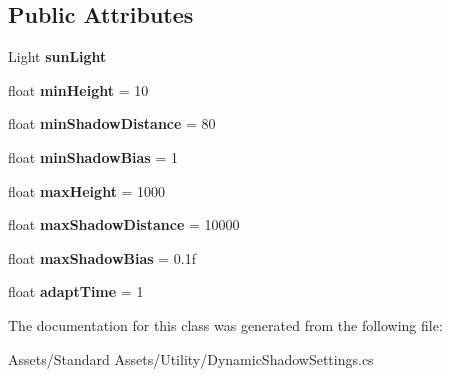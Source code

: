 \subsection*{Public Attributes}
\begin{DoxyCompactItemize}
\item 
Light {\bfseries sun\+Light}\hypertarget{class_unity_standard_assets_1_1_utility_1_1_dynamic_shadow_settings_a9113da6dce94c015bfefb8542e40b35a}{}\label{class_unity_standard_assets_1_1_utility_1_1_dynamic_shadow_settings_a9113da6dce94c015bfefb8542e40b35a}

\item 
float {\bfseries min\+Height} = 10\hypertarget{class_unity_standard_assets_1_1_utility_1_1_dynamic_shadow_settings_afadfe15321200124d550b56ffd1a113b}{}\label{class_unity_standard_assets_1_1_utility_1_1_dynamic_shadow_settings_afadfe15321200124d550b56ffd1a113b}

\item 
float {\bfseries min\+Shadow\+Distance} = 80\hypertarget{class_unity_standard_assets_1_1_utility_1_1_dynamic_shadow_settings_aee0894c90bbed7f83d5ced9b3f4b72d7}{}\label{class_unity_standard_assets_1_1_utility_1_1_dynamic_shadow_settings_aee0894c90bbed7f83d5ced9b3f4b72d7}

\item 
float {\bfseries min\+Shadow\+Bias} = 1\hypertarget{class_unity_standard_assets_1_1_utility_1_1_dynamic_shadow_settings_acf6fe9ea39b4dd184d9f2d60ea4bc1d3}{}\label{class_unity_standard_assets_1_1_utility_1_1_dynamic_shadow_settings_acf6fe9ea39b4dd184d9f2d60ea4bc1d3}

\item 
float {\bfseries max\+Height} = 1000\hypertarget{class_unity_standard_assets_1_1_utility_1_1_dynamic_shadow_settings_a7bd34b65a3aee3e55bfc86fdcb83d6f1}{}\label{class_unity_standard_assets_1_1_utility_1_1_dynamic_shadow_settings_a7bd34b65a3aee3e55bfc86fdcb83d6f1}

\item 
float {\bfseries max\+Shadow\+Distance} = 10000\hypertarget{class_unity_standard_assets_1_1_utility_1_1_dynamic_shadow_settings_a3a8c3949474554f330ad054b40fad3e2}{}\label{class_unity_standard_assets_1_1_utility_1_1_dynamic_shadow_settings_a3a8c3949474554f330ad054b40fad3e2}

\item 
float {\bfseries max\+Shadow\+Bias} = 0.\+1f\hypertarget{class_unity_standard_assets_1_1_utility_1_1_dynamic_shadow_settings_a3fb2ab54f5e9d224306a8589d00ee395}{}\label{class_unity_standard_assets_1_1_utility_1_1_dynamic_shadow_settings_a3fb2ab54f5e9d224306a8589d00ee395}

\item 
float {\bfseries adapt\+Time} = 1\hypertarget{class_unity_standard_assets_1_1_utility_1_1_dynamic_shadow_settings_acfdb112f4fd773a817eb266d6bfa8090}{}\label{class_unity_standard_assets_1_1_utility_1_1_dynamic_shadow_settings_acfdb112f4fd773a817eb266d6bfa8090}

\end{DoxyCompactItemize}


The documentation for this class was generated from the following file\+:\begin{DoxyCompactItemize}
\item 
Assets/\+Standard Assets/\+Utility/Dynamic\+Shadow\+Settings.\+cs\end{DoxyCompactItemize}
